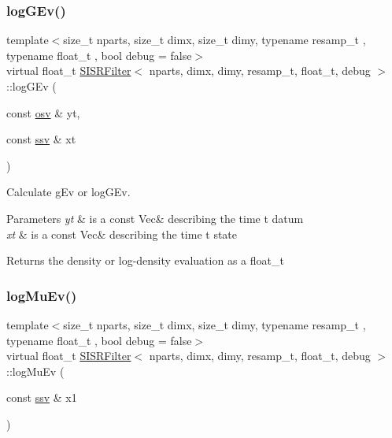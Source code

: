 \subsubsection{\texorpdfstring{log\+G\+Ev()}{logGEv()}}
{\footnotesize\ttfamily template$<$size\+\_\+t nparts, size\+\_\+t dimx, size\+\_\+t dimy, typename resamp\+\_\+t , typename float\+\_\+t , bool debug = false$>$ \\
virtual float\+\_\+t \hyperlink{classSISRFilter}{S\+I\+S\+R\+Filter}$<$ nparts, dimx, dimy, resamp\+\_\+t, float\+\_\+t, debug $>$\+::log\+G\+Ev (\begin{DoxyParamCaption}\item[{const \hyperlink{classSISRFilter_a42325662bf3d057ccc3eaa75fa2f70f9}{osv} \&}]{yt,  }\item[{const \hyperlink{classSISRFilter_ada0fdfca451ed6a22a8bba48a881819d}{ssv} \&}]{xt }\end{DoxyParamCaption})\hspace{0.3cm}{\ttfamily [pure virtual]}}



Calculate g\+Ev or log\+G\+Ev. 


\begin{DoxyParams}{Parameters}
{\em yt} & is a const Vec\& describing the time t datum \\
\hline
{\em xt} & is a const Vec\& describing the time t state \\
\hline
\end{DoxyParams}
\begin{DoxyReturn}{Returns}
the density or log-\/density evaluation as a float\+\_\+t 
\end{DoxyReturn}
\mbox{\label{classSISRFilter_a816874b65650e8900fe3470bafb957cf}} 
\subsubsection{\texorpdfstring{log\+Mu\+Ev()}{logMuEv()}}
{\footnotesize\ttfamily template$<$size\+\_\+t nparts, size\+\_\+t dimx, size\+\_\+t dimy, typename resamp\+\_\+t , typename float\+\_\+t , bool debug = false$>$ \\
virtual float\+\_\+t \hyperlink{classSISRFilter}{S\+I\+S\+R\+Filter}$<$ nparts, dimx, dimy, resamp\+\_\+t, float\+\_\+t, debug $>$\+::log\+Mu\+Ev (\begin{DoxyParamCaption}\item[{const \hyperlink{classSISRFilter_ada0fdfca451ed6a22a8bba48a881819d}{ssv} \&}]{x1 }\end{DoxyParamCaption})\hspace{0.3cm}{\ttfamily [pure virtual]}}



